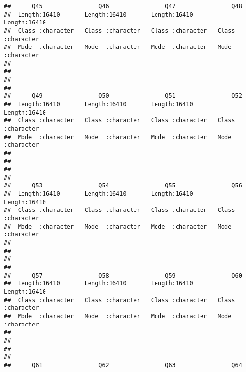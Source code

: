 \documentclass[
]{article}
\begin{document}
\begin{verbatim}
##      Q45                Q46                Q47                Q48           
##  Length:16410       Length:16410       Length:16410       Length:16410      
##  Class :character   Class :character   Class :character   Class :character  
##  Mode  :character   Mode  :character   Mode  :character   Mode  :character  
##                                                                             
##                                                                             
##                                                                             
##                                                                             
##      Q49                Q50                Q51                Q52           
##  Length:16410       Length:16410       Length:16410       Length:16410      
##  Class :character   Class :character   Class :character   Class :character  
##  Mode  :character   Mode  :character   Mode  :character   Mode  :character  
##                                                                             
##                                                                             
##                                                                             
##                                                                             
##      Q53                Q54                Q55                Q56           
##  Length:16410       Length:16410       Length:16410       Length:16410      
##  Class :character   Class :character   Class :character   Class :character  
##  Mode  :character   Mode  :character   Mode  :character   Mode  :character  
##                                                                             
##                                                                             
##                                                                             
##                                                                             
##      Q57                Q58                Q59                Q60           
##  Length:16410       Length:16410       Length:16410       Length:16410      
##  Class :character   Class :character   Class :character   Class :character  
##  Mode  :character   Mode  :character   Mode  :character   Mode  :character  
##                                                                             
##                                                                             
##                                                                             
##                                                                             
##      Q61                Q62                Q63                Q64           

\end{verbatim}
\end{document}
